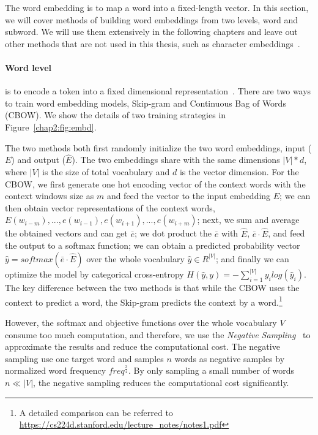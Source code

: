 The word embedding is to map a word into a fixed-length vector. 
In this section, we will cover methods of building word embeddings from two levels, word and subword. 
We will use them extensively in the following chapters and leave out other methods that are not used in this thesis, such as character embeddings~\cite{zhang2015character}.

\paragraph{Word level} is to encode a token into a fixed dimensional representation~\cite{mikolov2013distributed, pennington2014glove}. 
There are two ways to train word embedding models, Skip-gram and Continuous Bag of Words (CBOW).
We show the details of two training strategies in Figure~\ref{chap2:fig:embd}.

The two methods both first randomly initialize the two word embeddings, input ($E$) and output ($\hat{E}$).
The two embeddings share with the same dimensions $|V| * d$, where $|V|$ is the size of total vocabulary and $d$ is the vector dimension.
For the CBOW, we first generate one hot encoding vector of the context words with the context windows size as $m$ and feed the vector to the input embedding $E$; we can then obtain vector representations of the context words, $E(w_{i-m}), ..., e(w_{i-1}), e(w_{i+1}), ..., e(w_{i+m})$; next, we sum and average the obtained vectors and can get $\bar{e}$; we dot product the $\bar{e}$ with $\hat{E}$, $\bar{e} \cdot \hat{E} $, and feed the output to a softmax function; we can obtain a predicted probability vector $\hat{y} = softmax(\bar{e} \cdot \hat{E})$ over the whole vocabulary $\hat{y} \in R^{|V|}$; and finally we can optimize the model by categorical cross-entropy $H(\hat{y}, y) = -\sum^{|V|}_{i=1}y_ilog(\hat{y}_i)$.
The key difference between the two methods is that while the CBOW uses the context to predict a word, the Skip-gram predicts the context by a word.\footnote{A detailed comparison can be referred to \url{https://cs224d.stanford.edu/lecture_notes/notes1.pdf}}

However, the softmax and objective functions over the whole vocabulary $V$ consume too much computation, and therefore, we use the \textit{Negative Sampling}~\cite{mikolov2013distributed} to approximate the results and reduce the computational cost.
The negative sampling use one target word and samples $n$ words as negative samples by normalized word frequency $freq^{\frac{3}{4}}$.
By only sampling a small number of words $n \ll |V|$, the negative sampling reduces the computational cost significantly.

